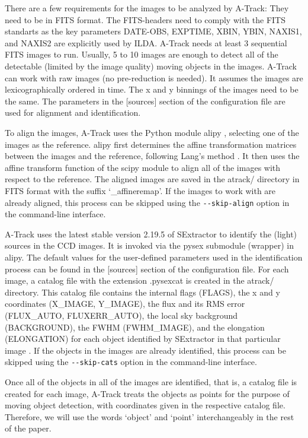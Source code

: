 \documentclass[review]{elsarticle}
\begin{document}
There are a few requirements for the images to be analyzed by A-Track: They need to be in FITS format. The FITS-headers need to comply with the FITS standarts \citep{fits_standarts} as the key parameters DATE-OBS, EXPTIME, XBIN, YBIN, NAXIS1, and NAXIS2 are explicitly used by ILDA. A-Track needs at least 3 sequential FITS images to run. Usually, 5 to 10 images are enough to detect all of the detectable (limited by the image quality) moving objects in the images. A-Track can work with raw images (no pre-reduction is needed). It assumes the images are lexicographically ordered in time. The x and y binnings of the images need to be the same. The parameters in the [sources] section of the configuration file are used for alignment and identification.

To align the images, A-Track uses the Python module alipy \citep{alipy}, selecting one of the images as the reference. alipy first determines the affine transformation matrices between the images and the reference,  following Lang's method \citep{lang2010}. It then uses the affine transform function of the scipy module to align all of the images with respect to the reference. The aligned images are saved in the atrack/ directory in FITS format with the suffix `\_affineremap'. If the images to work with are already aligned, this process can be skipped using the \verb;--skip-align; option in the command-line interface.

A-Track uses the latest stable version 2.19.5 of SExtractor to identify the (light) sources in the CCD images. It is invoked via the pysex submodule (wrapper) in alipy. The default values for the user-defined parameters used in the identification process can be found in the [sources] section of the configuration file. For each image, a catalog file with the extension .pysexcat is created in the atrack/ directory. This catalog file contains the internal flags (FLAGS), the x and y coordinates (X\_IMAGE, Y\_IMAGE), the flux and its RMS error (FLUX\_AUTO, FLUXERR\_AUTO), the local sky background (BACKGROUND), the FWHM (FWHM\_IMAGE), and the elongation (ELONGATION) for each object identified by SExtractor in that particular image \citep{bertin1996}. If the objects in the images are already identified, this process can be skipped using the \verb;--skip-cats; option in the command-line interface.

Once all of the objects in all of the images are identified, that is, a catalog file is created for each image, A-Track treats the objects as points for the purpose of moving object detection, with coordinates given in the respective catalog file. Therefore, we will use the words `object' and `point' interchangeably in the rest of the paper.
\end{document}
